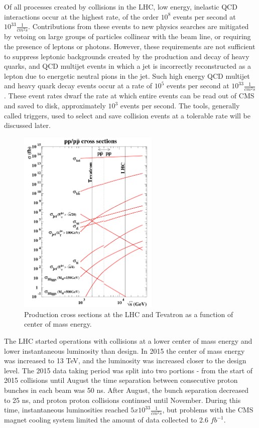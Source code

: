 Of all processes created by collisions in the LHC, low energy, inelastic QCD interactions occur at the highest rate, of the order
$10^{8}$ events per second at $10^{33} \frac{1}{cm^{2}s}$.  Contributions from these events to new physics searches are mitigated by vetoing
on large groups of particles collinear with the beam line, or requiring the presence of leptons or photons.  However, these
requirements are not sufficient to suppress leptonic backgrounds created by the production and decay of heavy quarks, and QCD multijet
events in which a jet is incorrectly reconstructed as a lepton due to energetic neutral pions in the jet.  Such high energy QCD multijet
and heavy quark decay events occur at a rate of $10^{5}$ events per second at $10^{33} \frac{1}{cm^{2}s}$.  These event rates dwarf
the rate at which entire events can be read out of CMS and saved to disk, approximately $10^{3}$ events per second.  The tools, generally
called triggers, used to select and save collision events at a tolerable rate will be discussed later.

\begin{figure}[h]
	\centering
	\includegraphics[width=0.6\textwidth]{figures/lhc_and_tevatron_cross_sections_2006.png}
	\caption{Production cross sections at the LHC and Tevatron as a function of center of mass energy. \cite{}}
	\label{fig:smProductionXsxns}
\end{figure}


The LHC started operations with collisions at a lower center of mass energy and lower instantaneous luminosity than design.  In 2015 the center of mass
energy was increased to 13 TeV, and the luminosity was increased closer to the design level.  The 2015 data taking period was split into two portions - from the start
of 2015 collisions until August the time separation between consecutive proton bunches in each beam was 50 ns.  After August, the bunch
separation decreased to 25 ns, and proton proton collisions continued until November.  During this time, instantaneous luminosities reached $5x10^{33} \frac{1}{cm^{2}s}$, but
problems with the CMS magnet cooling system limited the amount of data collected to 2.6 $fb^{-1}$.

